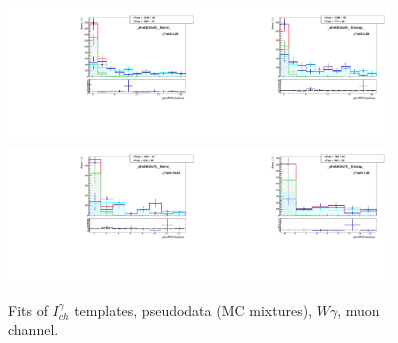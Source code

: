 \begin{figure}[htb]
\begin{center}
   \includegraphics[width=0.45\textwidth]{../figs/figs_v11/MUON_WGamma/TemplateFits/c_TEMPL_CHISO_UNblind__phoEt55to65__Barrel__RooFit_MCclosure.pdf}\includegraphics[width=0.45\textwidth]{../figs/figs_v11/MUON_WGamma/TemplateFits/c_TEMPL_CHISO_UNblind__phoEt55to65__Endcap__RooFit_MCclosure.pdf}\\
   \includegraphics[width=0.45\textwidth]{../figs/figs_v11/MUON_WGamma/TemplateFits/c_TEMPL_CHISO_UNblind__phoEt65to75__Barrel__RooFit_MCclosure.pdf}\includegraphics[width=0.45\textwidth]{../figs/figs_v11/MUON_WGamma/TemplateFits/c_TEMPL_CHISO_UNblind__phoEt65to75__Endcap__RooFit_MCclosure.pdf}\\
  \label{fig:templateFits_MCclosure_CHISO_MUON_2}
  \caption{Fits of $I_{ch}^{\gamma}$ templates, pseudodata (MC mixtures), $W\gamma$, muon channel.}
  \end{center}
\end{figure}

